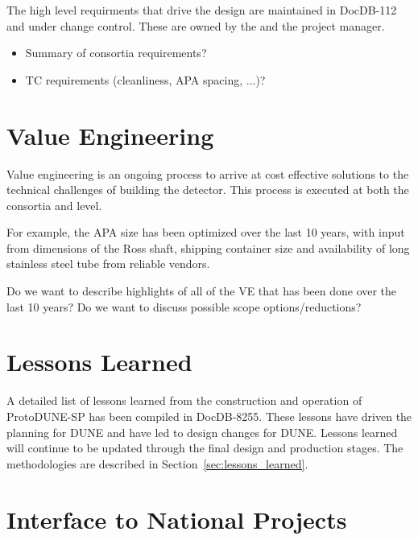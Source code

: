 The high level  requirments that drive the  design are
maintained in DocDB-112 and under change control. These are owned by
the   and the  project manager.

\begin{itemize}
 \item Summary of consortia requirements?
 \item TC requirements (cleanliness, APA spacing, ...)?
\end{itemize}


\section{Value Engineering}
\label{sec:fdsp-coord-ve}

Value engineering is an ongoing process to arrive at cost effective
solutions to the technical challenges of building the 
detector.  This process is executed at both the consortia and
 level.

For example, the APA size has been optimized over the last 10 years,
with input from dimensions of the Ross shaft, shipping container size
and availability of long stainless steel tube from reliable vendors.

Do we want to describe highlights of all of the VE that has been done
over the last 10 years? Do we want to discuss possible scope options/reductions?

\section{Lessons Learned}
\label{sec:fdsp-coord-lessons}

A detailed list of lessons learned from the construction and operation
of ProtoDUNE-SP has been compiled in DocDB-8255. These lessons have
driven the planning for DUNE and have led to design changes for
DUNE. Lessons learned will continue to be updated through the final
design and production stages. The methodologies are described in
Section~\ref{sec:lessons_learned}.

\section{Interface to National Projects}
\label{sec:fdsp-coord-national}

